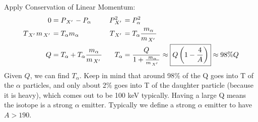 \documentclass{school-22.101-notes}
\begin{document}
Apply Conservation of Linear Momentum:
\begin{align}
0 &= P_{\left.X^{\prime}\right.} - P_{\alpha}  & P_{\left.X^{\prime}\right.}^2 &= P_{\alpha}^2 \\
T_{\left.X^{\prime}\right.} m_{\left.X^{\prime}\right.} &= T_{\alpha} m_{\alpha}  & T_{\left.X^{\prime}\right.} &= T_{\alpha} \frac{m_{\alpha}}{m_{\left.X^{\prime}\right.}} \\
Q &= T_{\alpha} + T_{\alpha} \frac{m_{\alpha}}{m_{\left.X^{\prime}\right.}}  & T_{\alpha} &= \frac{Q}{1 + \frac{m_{\alpha}}{m_{\left.X^{\prime}\right.}}}  \approx \boxed{ Q \left( 1 - \frac{4}{A} \right) } \approx 98\% Q
\end{align}
Given $Q$, we can find $T_{\alpha}$. Keep in mind that around 98\% of the Q goes into T of the $\alpha$ particles, and only about 2\% goes into T of the daughter particle (because it is heavy), which comes out to be 100 keV typically. Having a large Q means the isotope is a strong $\alpha$ emitter. Typically we define a strong $\alpha$ emitter to have $A > 190$.
\end{document}
